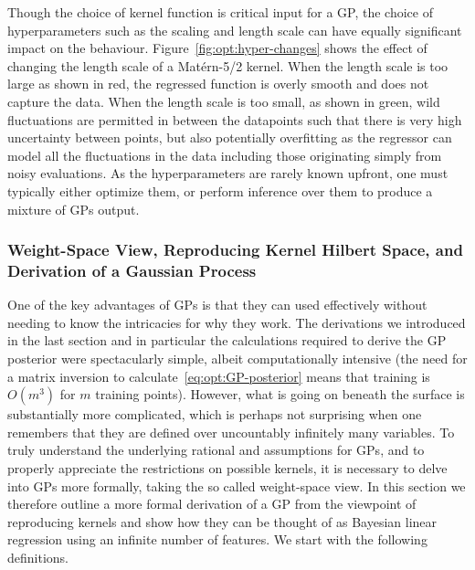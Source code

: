Though the choice of kernel function is critical input for a GP, the choice of
hyperparameters such as the scaling and length scale can have equally
significant impact on the behaviour.  Figure~\ref{fig:opt:hyper-changes} shows
the effect of changing the length scale of a Mat\'{e}rn-5/2 kernel.  When the length
scale is too large as shown in red, the regressed function is overly smooth and
does not capture the data.  When the length scale is too small, as shown in green,
wild fluctuations are permitted in between the datapoints such that there is very
high uncertainty between points, but also potentially overfitting as the regressor
can model all the fluctuations in the data including those originating simply from
noisy evaluations.
As the hyperparameters are rarely known upfront, one must typically either optimize
them, or perform inference over them to produce a mixture of GPs output.

\subsubsection{Weight-Space View, Reproducing Kernel Hilbert Space, and Derivation of a Gaussian Process}
\label{sec:opt:gps:weight}

One of the key advantages of GPs is that they can used effectively without needing
to know the intricacies for why they work.  The derivations we introduced in the
last section and in particular the calculations required to derive the GP posterior were
spectacularly simple, albeit computationally intensive (the need for a matrix inversion
to calculate~\eqref{eq:opt:GP-posterior} means that training is $O(m^3)$ for
$m$ training points).  However, what is going on beneath the surface is substantially
more complicated, which is perhaps not surprising when one remembers that they
are defined over uncountably infinitely many variables.  
To truly understand the underlying rational and assumptions for GPs, and to properly
appreciate the restrictions on possible kernels, it is necessary to delve into GPs more
formally, taking the so called weight-space view.
In this section we therefore outline a more formal derivation of a GP
from the viewpoint of reproducing kernels \cite{hofmann2008kernel}
and show how they can be thought of as Bayesian linear regression
using an infinite number of features.
We start with the following definitions.


